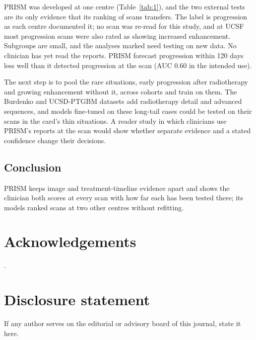 \documentclass[largeformat]{interact} %
\begin{document}
PRISM was developed at one centre (Table~\ref{tab:1}), and the two external tests are its only evidence that
its ranking of scans transfers. The label is progression as each centre
documented it; no scan was re-read for this study, and at UCSF most progression scans were also rated as showing
increased enhancement. Subgroups are small, and the analyses marked \textdagger{} need testing on new data. No
clinician has yet read the reports. PRISM forecast progression within 120 days less well than it detected progression at the scan
(AUC 0.60 in the intended use).

The next step is to pool the rare situations, early progression after radiotherapy and growing enhancement without
it, across cohorts and train on them. The Burdenko and UCSD-PTGBM datasets add radiotherapy detail and advanced
sequences, and models fine-tuned on these long-tail cases could be tested on their scans in the card's thin
situations. A reader study in which clinicians use PRISM's
reports at the scan would show whether separate evidence and a stated confidence change their decisions.

\subsection*{Conclusion}

PRISM keeps image and treatment-timeline evidence apart and shows the clinician both scores at every scan with how
far each has been tested there; its models ranked scans at two other centres without refitting.

\section*{Acknowledgements}
.

\section*{Disclosure statement}
 If any author serves on the editorial or advisory board of this journal, state it here.
\end{document}
